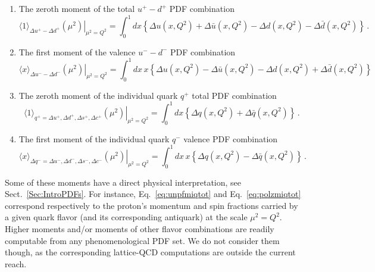 \begin{itemize}
\begin{enumerate}
\item The zeroth moment of the total $u^+-d^+$ PDF combination
\begin{equation}
\left.\langle 1 \rangle_{\Delta u^+-\Delta d^+}(\mu^2)\right|_{\mu^2=Q^2}
=
\int_0^1 dx \left\{\Delta u(x,Q^2)+\Delta\bar{u}(x,Q^2)
-\Delta d(x,Q^2)-\Delta\bar{d}(x,Q^2)\right\} \, .
\label{eq:polzmumdtot}
\end{equation}

\item The first moment of the valence $u^--d^-$ PDF combination
\begin{equation}
\left.\langle x\rangle_{\Delta u^--\Delta d^-}(\mu^2)\right|_{\mu^2=Q^2}
=
\int_0^1 dx\, x\left\{\Delta u(x,Q^2)-\Delta\bar{u}(x,Q^2)-\Delta d(x,Q^2)+\Delta \bar{d}(x,Q^2)\right\}
\label{eq:polfmumdval}  
\end{equation}

\item The zeroth moment of the individual quark $q^+$ total PDF combination
\begin{equation}
\left.\langle 1\rangle_{q^+=\Delta u^+,\Delta d^+,\Delta s^+,\Delta c^+}(\mu^2)\right|_{\mu^2=Q^2}
=
\int_0^1 dx \left\{\Delta q(x,Q^2)+\Delta\bar{q}(x,Q^2)\right\} \, .
\label{eq:polzmiqtot}
\end{equation}

\item The first moment of the individual quark $q^-$ valence PDF combination
\begin{equation}
\left.\langle x\rangle_{\Delta q^-=\Delta u^-,\Delta d^-,\Delta s^-,\Delta c^-}(\mu^2)\right|_{\mu^2=Q^2}
=
\int_0^1 dx\, x\left\{\Delta q(x,Q^2)-\Delta\bar{q}(x,Q^2)\right\} \, .
\label{eq:polfmiqval}
\end{equation}

\end{enumerate}

\end{itemize}

Some of these moments have a direct physical interpretation, see 
Sect.~\ref{Sec:IntroPDFs}.
%
For instance, Eq.~\eqref{eq:unpfmiqtot} and Eq.~\eqref{eq:polzmiqtot}
correspond respectively to the proton's momentum and spin fractions carried
by a given quark flavor (and its corresponding antiquark) at the scale 
$\mu^2=Q^2$.
%
Higher moments and/or moments of other flavor combinations are readily
computable from any phenomenological PDF set.
%
We do not consider them though, as the corresponding lattice-QCD
computations are outside the current reach.
